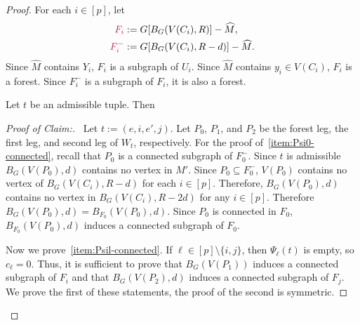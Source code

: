 \documentclass{patmorin}
\newcommand{\pat}[1]{\textcolor{Blue}{Pat: #1}}
\newcommand{\piotr}[1]{\textcolor{red}{Piotr: #1}}
\newenvironment{clmproof}{\begin{proof}[Proof of Claim:]\renewcommand{\qedsymbol}{\rule{1ex}{1ex}}}{\end{proof}}
\DeclarePairedDelimiter\set{\{}{\}}
\begin{document}
\begin{proof}
For each $i\in[p]$, let 
\begin{align*}
\mathdefin{F_i}&:=G[B_G(V(C_i),R)]-\widehat{M},\\
\mathdefin{F_i^-}&:=G[B_G(V(C_i),R-d)]-\widehat{M}. 
\end{align*}
Since $\widehat{M}$ contains $Y_i$, $F_i$ is a subgraph of $U_i$.  Since $\widehat{M}$ contains $y_i\in V(C_i)$, $F_i$ is a forest.  Since $F^-_i$ is a subgraph of $F_i$, it is also a forest.

\begin{clm}\label{clm:three-components}
Let $t$ be an admissible tuple. Then
\end{clm}

\begin{clmproof}\
    Let $t:=(e,i,e',j)$. 
    Let $P_0$, $P_1$, and $P_2$ be the forest leg, the first leg, and second leg of $W_t$, respectively.   For the proof of~\cref{item:Psi0-connected}, recall that $P_0$ is a connected subgraph of $F_0^-$. Since $t$ is admissible $B_G(V(P_0),d)$ contains no vertex in $M'$. Since $P_0\subseteq F_0^-$, $V(P_0)$ contains no vertex of $B_G(V(C_i),R-d)$ for each $i\in[p]$. Therefore, $B_G(V(P_0),d)$ contains no vertex in $B_G(V(C_i),R-2d)$ for any $i\in[p]$. Therefore $B_G(V(P_0),d)=B_{F_0}(V(P_0),d)$.
    Since $P_0$ is connected in $F_0$, 
    $B_{F_0}(V(P_0),d)$ induces a connected subgraph of $F_0$. 
    
    Now we prove~\cref{item:Psil-connected}. If $\ell\in [p]\setminus\{i,j\}$, then $\Psi_\ell(t)$ is empty, so $c_\ell=0$.
    Thus, it is sufficient to prove that $B_G(V(P_1))$ induces a connected subgraph of $F_i$ and that $B_G(V(P_2),d)$ induces a connected subgraph of $F_j$.  We prove the first of these statements, the proof of the second is symmetric.
    

\end{clmproof}
\end{proof}
\end{document}
